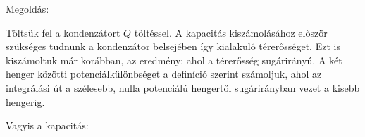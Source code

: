 
\ifdefined\megoldas

 Megoldás: 

 Töltsük fel a kondenzátort $Q$ töltéssel. A kapacitás kiszámolásához először szükséges tudnunk a kondenzátor belsejében így kialakuló térerősséget. Ezt is kiszámoltuk már korábban, az eredmény:
 ahol a térerősség sugárirányú. A két henger közötti potenciálkülönbséget a definíció szerint számoljuk, ahol az integrálási út a szélesebb, nulla potenciálú hengertől sugárirányban vezet a kisebb hengerig.

 Vagyis a kapacitás:
 
\fi